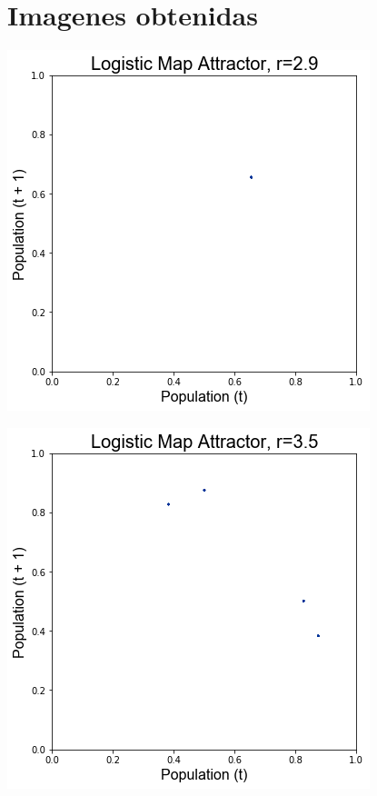 \documentclass[a4paper,12pt]{article}
\begin{document}
\section*{Imagenes obtenidas}
\begin{center}
\includegraphics[scale=0.5]{5.png}
\end{center}
\begin{center}
\includegraphics[scale=0.5]{6.png}
\end{center}
\end{document}
